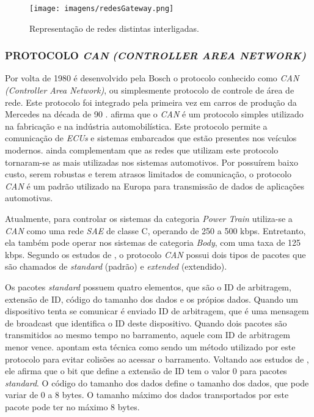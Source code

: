 \begin{figure}[!ht]
\centering
\caption{Representação de redes distintas interligadas.} 
{\texttt{[image: imagens/redesGateway.png]}}\\
 \label{Fig:redes_gateway}
\end{figure}

\subsubsection{PROTOCOLO \textit{CAN} \textit{(CONTROLLER AREA NETWORK)}}
Por volta de 1980 é desenvolvido pela Bosch o protocolo conhecido como \textit{CAN} \textit{(Controller Area Network)}, ou simplesmente protocolo de controle de área de rede. Este protocolo foi integrado pela primeira vez em carros de produção da Mercedes na década de 90 \cite{navetsimonotlion}.  afirma que o \textit{CAN} é um protocolo simples utilizado na fabricação e na indústria automobilística. Este protocolo permite a comunicação de \textit{ECUs} e sistemas embarcados que estão presentes nos veículos modernos.  ainda complementam que as redes que utilizam este protocolo tornaram-se as mais utilizadas nos sistemas automotivos. Por possuírem baixo custo, serem robustas e terem atrasos limitados de comunicação, o protocolo \textit{CAN} é um padrão utilizado na Europa para transmissão de dados de aplicações automotivas.

Atualmente, para controlar os sistemas da categoria \textit{Power Train} utiliza-se a \textit{CAN} como uma rede \textit{SAE} de classe C, operando de 250 a 500 kbps. Entretanto, ela também pode operar nos sistemas de categoria \textit{Body}, com uma taxa de 125 kbps. Segundo os estudos de , o protocolo \textit{CAN} possui dois tipos de pacotes que são chamados de \textit{standard} (padrão) e \textit{extended} (extendido).

Os pacotes \textit{standard} possuem quatro elementos, que são o ID de arbitragem, extensão de ID, código do tamanho dos dados e os própios dados. Quando um dispositivo tenta se comunicar é enviado ID de arbitragem, que é uma mensagem de broadcast que identifica o ID deste dispositivo. Quando dois pacotes são transmitidos ao mesmo tempo no barramento, aquele com ID de arbitragem menor vence.  apontam esta técnica como sendo um método utilizado por este protocolo para evitar colisões ao acessar o barramento. Voltando aos estudos de , ele afirma que o bit que define a extensão de ID tem o valor 0 para pacotes \textit{standard}. O código do tamanho dos dados define o tamanho dos dados, que pode variar de 0 a 8 bytes. O tamanho máximo dos dados transportados por este pacote pode ter no máximo 8 bytes.


